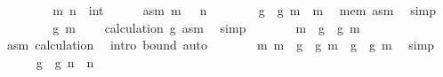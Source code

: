\begin{isabellebody}
\ \ \isacommand{{\isacharbraceleft}{\kern0pt}}\isamarkupfalse%
\isanewline
\ \ \ \ \isamarkupfalse%
\ m\ n\ {\isacharcolon}{\kern0pt}{\isacharcolon}{\kern0pt}\ int\isanewline
\ \ \ \ \isamarkupfalse%
\ asm{\isacharcolon}{\kern0pt}\ {\isachardoublequoteopen}m\ {\isachargreater}{\kern0pt}\ {}{\isachardoublequoteclose}\ {\isachardoublequoteopen}n\ {\isachargreater}{\kern0pt}\ {}{\isachardoublequoteclose}\isanewline
\isanewline
\ \ \ \ \isamarkupfalse%
\ {\isachardoublequoteopen}g\ {\isacharparenleft}{\kern0pt}{\isacharquery}{\kern0pt}{\isasymphi}\ g\ m{\isacharparenright}{\kern0pt}\ {\isasymge}\ m{\isachardoublequoteclose}\ \isamarkupfalse%
\ {\isasymphi}{\isacharunderscore}{\kern0pt}mem\ asm\ \isamarkupfalse%
\ simp\isanewline
\ \ \ \ \isamarkupfalse%
\ \isamarkupfalse%
\ {\isachardoublequoteopen}{\isacharquery}{\kern0pt}{\isasymphi}\ g\ m\ {\isachargreater}{\kern0pt}\ {}{\isachardoublequoteclose}\ \isamarkupfalse%
\ calculation\ g\ asm\ \isamarkupfalse%
\ simp\isanewline
\ \ \ \ \isamarkupfalse%
\ \isamarkupfalse%
\ {\isachardoublequoteopen}m\ {\isachargreater}{\kern0pt}\ g\ {\isacharparenleft}{\kern0pt}{\isacharquery}{\kern0pt}{\isasymphi}\ g\ m\ {\isacharminus}{\kern0pt}\ {}{\isacharparenright}{\kern0pt}{\isachardoublequoteclose}\ \isamarkupfalse%
\ asm\ calculation\ \isamarkupfalse%
\ {\isacharparenleft}{\kern0pt}intro\ {\isasymphi}{\isacharunderscore}{\kern0pt}bound{\isacharprime}{\kern0pt}{\isacharparenright}{\kern0pt}\ auto\isanewline
\ \ \ \ \isamarkupfalse%
\ \isamarkupfalse%
\ m{\isacharcolon}{\kern0pt}\ {\isachardoublequoteopen}m\ {\isasymin}\ {\isacharbraceleft}{\kern0pt}g\ {\isacharparenleft}{\kern0pt}{\isacharquery}{\kern0pt}{\isasymphi}\ g\ m\ {\isacharminus}{\kern0pt}\ {}{\isacharparenright}{\kern0pt}{\isacharless}{\kern0pt}{\isachardot}{\kern0pt}{\isachardot}{\kern0pt}g\ {\isacharparenleft}{\kern0pt}{\isacharquery}{\kern0pt}{\isasymphi}\ g\ m{\isacharparenright}{\kern0pt}{\isacharbraceright}{\kern0pt}{\isachardoublequoteclose}\ \isamarkupfalse%
\ simp\isanewline
\isanewline
\ \ \ \ \isamarkupfalse%
\ {\isachardoublequoteopen}g\ {\isacharparenleft}{\kern0pt}{\isacharquery}{\kern0pt}{\isasymphi}\ g\ n{\isacharparenright}{\kern0pt}\ {\isasymge}\ n{\isachardoublequoteclose}\ \isamarkupfalse%

\end{isabellebody}
